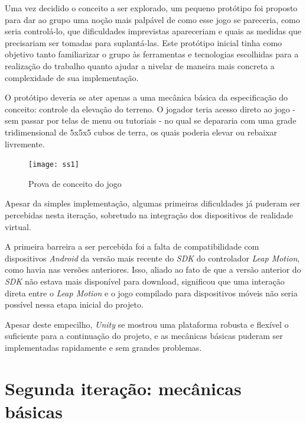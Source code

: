 Uma vez decidido o conceito a ser explorado, um pequeno protótipo foi proposto para dar ao grupo uma noção mais palpável de como esse jogo se pareceria, como seria controlá-lo, que dificuldades imprevistas apareceriam e quais as medidas que precisariam ser tomadas para suplantá-las. Este protótipo inicial tinha como objetivo tanto familiarizar o grupo às ferramentas e tecnologias escolhidas para a realização do trabalho quanto ajudar a nivelar de maneira mais concreta a complexidade de sua implementação.

O protótipo deveria se ater apenas a uma mecânica básica da especificação do conceito: controle da elevação do terreno. O jogador teria acesso direto ao jogo - sem passar por telas de menu ou tutoriais - no qual se depararia com uma grade tridimensional de 5x5x5 cubos de terra, os quais poderia elevar ou rebaixar livremente.

\begin{figure}[h]
	\centering
	\texttt{[image: ss1]}
	\caption{Prova de conceito do jogo}
\end{figure}

Apesar da simples implementação, algumas  primeiras dificuldades já puderam ser percebidas nesta iteração, sobretudo na integração dos dispositivos de realidade virtual.

A primeira barreira a ser percebida foi a falta de compatibilidade com dispositivos \textit{Android} da versão mais recente do \textit{SDK} do controlador \textit{Leap Motion}, como havia nas versões anteriores. Isso, aliado ao fato de que a versão anterior do \textit{SDK} não estava mais disponível para download, significou que uma interação direta entre o \textit{Leap Motion} e o jogo compilado para dispositivos móveis não seria possível nessa etapa inicial do projeto.

Apesar deste empecilho, \textit{Unity} se mostrou uma plataforma robusta e flexível o suficiente para a continuação do projeto, e as mecânicas básicas puderam ser implementadas rapidamente e sem grandes problemas.



\section{Segunda iteração: mecânicas básicas}\label{sec-segunda-iteracao-mecanicas-basicas}

